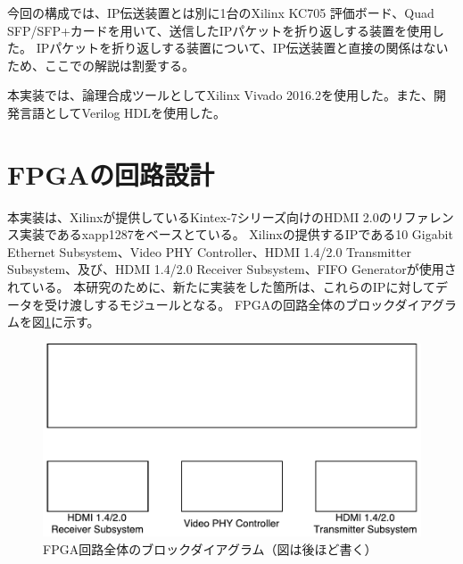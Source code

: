 
今回の構成では、IP伝送装置とは別に1台のXilinx KC705 評価ボード、Quad SFP/SFP+カードを用いて、送信したIPパケットを折り返しする装置を使用した。
IPパケットを折り返しする装置について、IP伝送装置と直接の関係はないため、ここでの解説は割愛する。

本実装では、論理合成ツールとしてXilinx Vivado 2016.2を使用した。また、開発言語としてVerilog HDLを使用した。

\section{FPGAの回路設計}

本実装は、Xilinxが提供しているKintex-7シリーズ向けのHDMI 2.0のリファレンス実装であるxapp1287\cite{xilinx-xapp1287}をベースとている。
Xilinxの提供するIPである10 Gigabit Ethernet Subsystem\cite{xilinx-pg157}、Video PHY Controller\cite{xilinx-pg230}、HDMI 1.4/2.0 Transmitter Subsystem\cite{xilinx-pg235}、及び、HDMI 1.4/2.0 Receiver Subsystem\cite{xilinx-pg236}、FIFO Generator\cite{xilinx-pg057}が使用されている。
本研究のために、新たに実装をした箇所は、これらのIPに対してデータを受け渡しするモジュールとなる。
FPGAの回路全体のブロックダイアグラムを図\ref{fig:fpga-whole-diagram}に示す。

\begin{figure}[htbp]
  \begin{center}
    \includegraphics[bb=0 0 452 229,width=15.5cm]{img/fpga-whole-diagram.pdf}
  \end{center}
  \caption{FPGA回路全体のブロックダイアグラム（図は後ほど書く）}
  \label{fig:fpga-whole-diagram}
\end{figure}

